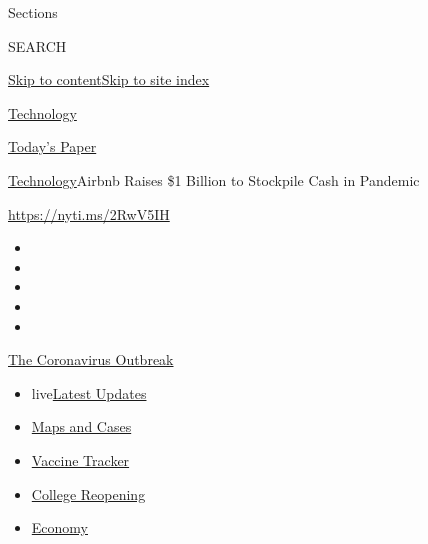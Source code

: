 Sections

SEARCH

\protect\hyperlink{site-content}{Skip to
content}\protect\hyperlink{site-index}{Skip to site index}

\href{https://www.nytimes3xbfgragh.onion/section/technology}{Technology}

\href{https://myaccount.nytimes3xbfgragh.onion/auth/login?response_type=cookie\&client_id=vi}{}

\href{https://www.nytimes3xbfgragh.onion/section/todayspaper}{Today's
Paper}

\href{/section/technology}{Technology}\textbar{}Airbnb Raises \$1
Billion to Stockpile Cash in Pandemic

\url{https://nyti.ms/2RwV5IH}

\begin{itemize}
\item
\item
\item
\item
\item
\end{itemize}

\href{https://www.nytimes3xbfgragh.onion/news-event/coronavirus?action=click\&pgtype=Article\&state=default\&region=TOP_BANNER\&context=storylines_menu}{The
Coronavirus Outbreak}

\begin{itemize}
\tightlist
\item
  live\href{https://www.nytimes3xbfgragh.onion/2020/08/03/world/coronavirus-covid-19.html?action=click\&pgtype=Article\&state=default\&region=TOP_BANNER\&context=storylines_menu}{Latest
  Updates}
\item
  \href{https://www.nytimes3xbfgragh.onion/interactive/2020/us/coronavirus-us-cases.html?action=click\&pgtype=Article\&state=default\&region=TOP_BANNER\&context=storylines_menu}{Maps
  and Cases}
\item
  \href{https://www.nytimes3xbfgragh.onion/interactive/2020/science/coronavirus-vaccine-tracker.html?action=click\&pgtype=Article\&state=default\&region=TOP_BANNER\&context=storylines_menu}{Vaccine
  Tracker}
\item
  \href{https://www.nytimes3xbfgragh.onion/2020/08/02/us/covid-college-reopening.html?action=click\&pgtype=Article\&state=default\&region=TOP_BANNER\&context=storylines_menu}{College
  Reopening}
\item
  \href{https://www.nytimes3xbfgragh.onion/live/2020/08/03/business/stock-market-today-coronavirus?action=click\&pgtype=Article\&state=default\&region=TOP_BANNER\&context=storylines_menu}{Economy}
\end{itemize}

